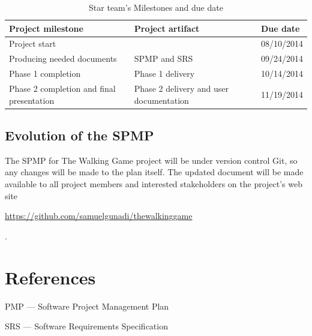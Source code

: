 \documentclass[12pt,letterpaper]{article}
\begin{document}
	\begin{table}[h]
		\begin{tabular}{|p{2.28 in}|p{2.6 in}|p{1.05 in}|}
			\hline
			{\bfseries Project milestone} & {\bfseries Project artifact} & {\bfseries Due date} \\\hline
			Project start                 &                              & 08/10/2014 \\\hline
			Producing needed documents    & SPMP and SRS                 & 09/24/2014 \\\hline
			Phase 1 completion            & Phase 1 delivery             & 10/14/2014 \\\hline
			Phase 2 completion and final presentation & Phase 2 delivery and user documentation & 11/19/2014 \\\hline
		\end{tabular}
		\caption{Star team's Milestones and due date}
		\label{tab:t1}
	\end{table}
	
	\subsection{Evolution of the SPMP}
	The SPMP for The Walking Game project will be under version control Git, so any changes will be made to the plan itself. The updated document will be made available to all project members and interested stakeholders on the project's web site \begin{footnotesize}\url{https://github.com/samuelgunadi/thewalkinggame}\end{footnotesize}.
	
	\nocite{*}
	
	\begingroup
		\section{References}
		\renewcommand{\section}[2]{}%
		
		
	\endgroup
	
	\clearpage
	\section{Definitions}
	SPMP --- Software Project Management Plan
	
	\vspace{0.1in}\noindent SRS --- Software Requirements Specification
	
\end{document}
